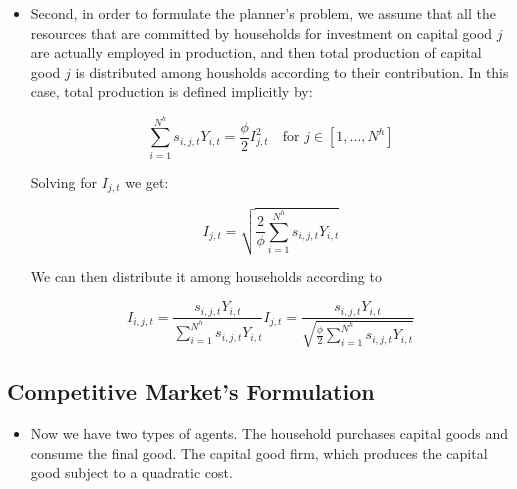 \documentclass[11pt]{article}
\numberwithin{equation}{section}
\begin{document}
\begin{itemize}
\begin{itemize}
		\item Second, in order to formulate the planner's problem, we assume that all the resources that are committed by households for investment on capital good $j$ are actually employed in production, and then total production of capital good $j$ is distributed among housholds according to their contribution. In this case, total production is defined implicitly by:
		
		$$\sum_{i=1}^{N^h} s_{i,j,t} Y_{i,t} = \frac{\phi}{2} I_{j,t}^2 \quad \text{for } j \in [1,...,N^h]$$
		
		Solving for $I_{j,t}$ we get:
		
		$$I_{j,t} =  \sqrt{\frac{2}{\phi} \sum_{i=1}^{N^h} s_{i,j,t} Y_{i,t}}$$
		
		We can then distribute it among households according to
		
		$$I_{i,j,t} = \frac{s_{i,j,t}Y_{i,t}}{ \sum_{i=1}^{N^h} s_{i,j,t} Y_{i,t}}  I_{j,t} =   \frac{s_{i,j,t}Y_{i,t}}{\sqrt{\frac{\phi}{2} \sum_{i=1}^{N^h} s_{i,j,t} Y_{i,t}}}$$
	
	\end{itemize}  
\end{itemize}

	\subsection{Competitive Market's Formulation}

\begin{itemize}
	\item Now we have two types of agents.  The household purchases capital goods and consume the final good.  The capital good firm, which produces the capital good subject to a quadratic cost. 
\end{itemize}
\end{document}
